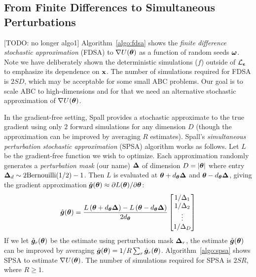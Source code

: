 \documentclass[]{article}
\begin{document}
\subsection{From Finite Differences to Simultaneous Perturbations}
%

[TODO: no longer algo1] Algorithm~\ref{algo:fdsa} shows the {\em finite difference stochastic approximation} (FDSA) \cite{kiefer1952stochastic} to $\nabla U({\bm \theta})$ as a function of random seeds ${\bm \omega}$.  Note we have deliberately shown the deterministic simulations ($f$) outside of $\mathcal{L}_{{\bm {\epsilon}}}$ to emphasize its dependence on ${\bf x}$.  The number of simulations required for FDSA is $2 S D$, which may be acceptable for some small ABC problems.  Our goal is to scale ABC to high-dimensions and for that we need an alternative stochastic approximation of $\nabla U({\bm \theta})$.

In the gradient-free setting, Spall \cite{spall1992multivariate, spall2000adaptive} provides a stochastic approximate to the true gradient using only $2$ forward simulations for any dimension $D$ (though the approximation can be improved by averaging $R$ estimates).  Spall's {\em simultaneous perturbation stochastic approximation} (SPSA) algorithm works as follows. Let $L$ be the gradient-free function we wish to optimize.  Each approximation randomly generates a {\em perturbation mask} (our name) ${\bm \Delta}$ of dimension $D=|{\bm \theta}|$ where entry ${\bm \Delta}_d \sim 2 \text{Bernouilli}(1/2) - 1$.  Then $L$ is evaluated at ${\bm \theta}+d_{{\bm \theta}} {\bm \Delta}$ and ${\bm \theta}-d_{{\bm \theta}} {\bm \Delta}$, giving the gradient approximation $\hat{{\bm g }}({\bm \theta}) \approx \partial L({\bm \theta}) / \partial {\bm \theta}$:
\begin{equation}
  \hat{{\bm g }}({\bm \theta}) = \frac{L\left({\bm \theta}+d_{{\bm \theta}} {\bm \Delta}\right) - L\left({\bm \theta}-d_{{\bm \theta}} {\bm \Delta}\right)}{2 d_{{\bm \theta}}} \begin{bmatrix} 
                                   1/\Delta_1 \\
                                   1/\Delta_2 \\
                                   \vdots \\
                                   1/\Delta_D \\
                                \end{bmatrix}
\end{equation}
If we let $\hat{{\bm g }}_r({\bm \theta})$ be the estimate using perturbation mask ${\bm \Delta}_r$, the estimate $\hat{{\bm g }}({\bm \theta})$ can be improved by averaging $\hat{{\bm g }}({\bm \theta}) = 1/R \sum_r \hat{{\bm g }}_r({\bm \theta})$.
Algorithm~\ref{algo:spsa} shows SPSA to estimate $\nabla U({\bm \theta})$.  The number of simulations required for SPSA is $2 S R$, where $R \geq 1$.
\end{document}
